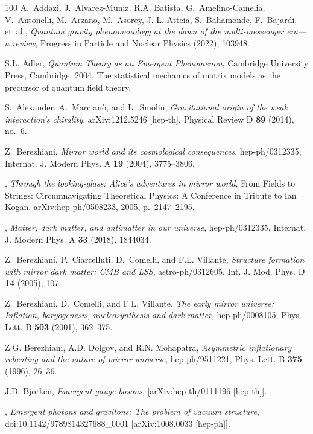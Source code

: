 \documentclass[reqno,11pt]{amsart}
\numberwithin{equation}{section}
\newcommand{\1}{\mbox{\rm 1 \hspace{-1.05 em} 1}}
\begin{document}
{\begin{thebibliography}{100}
A.~Addazi, J.~Alvarez-Muniz, R.A. Batista, G.~Amelino-Camelia, V.~Antonelli,
  M.~Arzano, M.~Asorey, J.-L. Atteia, S.~Bahamonde, F.~Bajardi, et~al.,
  \emph{Quantum gravity phenomenology at the dawn of the multi-messenger
  era—a review}, Progress in Particle and Nuclear Physics (2022), 103948.

S.L. Adler, \emph{{Q}uantum {T}heory as an {E}mergent {P}henomenon}, Cambridge
  University Press, Cambridge, 2004, The statistical mechanics of matrix models
  as the precursor of quantum field theory.

S.~Alexander, A.~Marcianò, and L.~Smolin, \emph{Gravitational origin of the
  weak interaction’s chirality}, arXiv:1212.5246 [hep-th], Physical Review D
  \textbf{89} (2014), no.~6.

Z.~Berezhiani, \emph{Mirror world and its cosmological consequences},
  hep-ph/0312335, Internat. J. Modern Phys. A \textbf{19} (2004), 3775–3806.

\bysame, \emph{Through the looking-glass: Alice’s adventures in mirror
  world}, From Fields to Strings: Circumnavigating Theoretical Physics: A
  Conference in Tribute to Ian Kogan, arXiv:hep-ph/0508233, 2005,
  p.~2147–2195.

\bysame, \emph{Matter, dark matter, and antimatter in our universe},
  hep-ph/0312335, Internat. J. Modern Phys. A \textbf{33} (2018), 1844034.

Z.~Berezhiani, P.~Ciarcelluti, D.~Comelli, and F.L. Villante, \emph{Structure
  formation with mirror dark matter: {CMB} and {LSS}}, astro-ph/0312605, Int.
  J. Mod. Phys. D \textbf{14} (2005), 107.

Z.~Berezhiani, D.~Comelli, and F.L. Villante, \emph{The early mirror universe:
  Inflation, baryogenesis, nucleosynthesis and dark matter}, hep-ph/0008105,
  Phys. Lett. B \textbf{503} (2001), 362--375.

Z.G. Berezhiani, A.D. Dolgov, and R.N. Mohapatra, \emph{Asymmetric inflationary
  reheating and the nature of mirror universe}, hep-ph/9511221, Phys. Lett. B
  \textbf{375} (1996), 26--36.

J.D. Bjorken, \emph{Emergent gauge bosons}, [arXiv:hep-th/0111196 [hep-th]].

\bysame, \emph{Emergent photons and gravitons: {T}he problem of vacuum
  structure}, doi:10.1142/9789814327688\_0001 [arXiv:1008.0033 [hep-ph]].


\end{thebibliography}}
\end{document}
